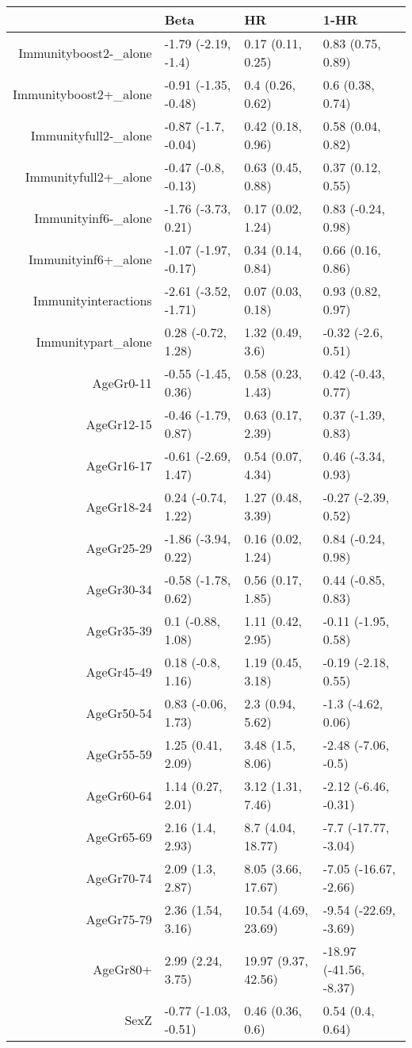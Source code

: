 \begin{table}[ht]
\centering
\begin{tabular}{rlll}
  \hline
 & Beta & HR & 1-HR \\ 
  \hline
Immunityboost2-\_alone & -1.79 (-2.19, -1.4) & 0.17 (0.11, 0.25) & 0.83 (0.75, 0.89) \\ 
  Immunityboost2+\_alone & -0.91 (-1.35, -0.48) & 0.4 (0.26, 0.62) & 0.6 (0.38, 0.74) \\ 
  Immunityfull2-\_alone & -0.87 (-1.7, -0.04) & 0.42 (0.18, 0.96) & 0.58 (0.04, 0.82) \\ 
  Immunityfull2+\_alone & -0.47 (-0.8, -0.13) & 0.63 (0.45, 0.88) & 0.37 (0.12, 0.55) \\ 
  Immunityinf6-\_alone & -1.76 (-3.73, 0.21) & 0.17 (0.02, 1.24) & 0.83 (-0.24, 0.98) \\ 
  Immunityinf6+\_alone & -1.07 (-1.97, -0.17) & 0.34 (0.14, 0.84) & 0.66 (0.16, 0.86) \\ 
  Immunityinteractions & -2.61 (-3.52, -1.71) & 0.07 (0.03, 0.18) & 0.93 (0.82, 0.97) \\ 
  Immunitypart\_alone & 0.28 (-0.72, 1.28) & 1.32 (0.49, 3.6) & -0.32 (-2.6, 0.51) \\ 
  AgeGr0-11 & -0.55 (-1.45, 0.36) & 0.58 (0.23, 1.43) & 0.42 (-0.43, 0.77) \\ 
  AgeGr12-15 & -0.46 (-1.79, 0.87) & 0.63 (0.17, 2.39) & 0.37 (-1.39, 0.83) \\ 
  AgeGr16-17 & -0.61 (-2.69, 1.47) & 0.54 (0.07, 4.34) & 0.46 (-3.34, 0.93) \\ 
  AgeGr18-24 & 0.24 (-0.74, 1.22) & 1.27 (0.48, 3.39) & -0.27 (-2.39, 0.52) \\ 
  AgeGr25-29 & -1.86 (-3.94, 0.22) & 0.16 (0.02, 1.24) & 0.84 (-0.24, 0.98) \\ 
  AgeGr30-34 & -0.58 (-1.78, 0.62) & 0.56 (0.17, 1.85) & 0.44 (-0.85, 0.83) \\ 
  AgeGr35-39 & 0.1 (-0.88, 1.08) & 1.11 (0.42, 2.95) & -0.11 (-1.95, 0.58) \\ 
  AgeGr45-49 & 0.18 (-0.8, 1.16) & 1.19 (0.45, 3.18) & -0.19 (-2.18, 0.55) \\ 
  AgeGr50-54 & 0.83 (-0.06, 1.73) & 2.3 (0.94, 5.62) & -1.3 (-4.62, 0.06) \\ 
  AgeGr55-59 & 1.25 (0.41, 2.09) & 3.48 (1.5, 8.06) & -2.48 (-7.06, -0.5) \\ 
  AgeGr60-64 & 1.14 (0.27, 2.01) & 3.12 (1.31, 7.46) & -2.12 (-6.46, -0.31) \\ 
  AgeGr65-69 & 2.16 (1.4, 2.93) & 8.7 (4.04, 18.77) & -7.7 (-17.77, -3.04) \\ 
  AgeGr70-74 & 2.09 (1.3, 2.87) & 8.05 (3.66, 17.67) & -7.05 (-16.67, -2.66) \\ 
  AgeGr75-79 & 2.36 (1.54, 3.16) & 10.54 (4.69, 23.69) & -9.54 (-22.69, -3.69) \\ 
  AgeGr80+ & 2.99 (2.24, 3.75) & 19.97 (9.37, 42.56) & -18.97 (-41.56, -8.37) \\ 
  SexZ & -0.77 (-1.03, -0.51) & 0.46 (0.36, 0.6) & 0.54 (0.4, 0.64) \\ 
   \hline
\end{tabular}
\end{table}
